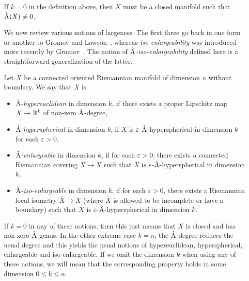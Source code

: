 \documentclass[pdftex]{sigma}
\numberwithin{equation}{section}
\begin{document}
\begin{Remark}
 If \(k = 0\) in the definition above, then \(X\) must be a closed manifold such that \(\hat{\mathrm{A}}(X) \neq 0\).
\end{Remark}

We now review various notions of largeness.
The first three go back in one form or another to Gromov and Lawson~\cite{gromov-lawson:spin-and-scalar-in-presence,GromovLawson:PSCDiracComplete}, whereas \emph{iso-enlargeability} was introduced more recently by Gromov~\cite{Gromov:MetricInequalitiesScalar}.
The notion of \emph{\(\hat{\mathrm{A}}\)-iso-enlargeability} defined here is a straightforward generalization of the latter.

\begin{Definition}
 Let \(X\) be a connected oriented Riemannian manifold of dimension \(n\) without boundary. We say that \(X\) is
 \begin{itemize}\itemsep=0pt
 \item \(\hat{\mathrm{A}}\)-\emph{hypereuclidean} in dimension \(k\), if there exists a proper Lipschitz map \(X \to \mathbb{R}^k\) of non-zero \(\hat{\mathrm{A}}\)-degree,
 \item \(\hat{\mathrm{A}}\)-\emph{hyperspherical} in dimension \(k\), if \(X\) is \(\varepsilon\)-\(\hat{\mathrm{A}}\)-hyperspherical in dimension \(k\) for each \(\varepsilon > 0\),
 \item \(\hat{\mathrm{A}}\)-\emph{enlargeable} in dimension \(k\), if for each \(\varepsilon >0 \), there exists a connected Riemannian covering \(\bar{X} \to X\) such that \(\bar{X}\) is \(\varepsilon\)-\(\hat{\mathrm{A}}\)-hyperspherical in dimension \(k\),
 \item \(\hat{\mathrm{A}}\)-\emph{iso-enlargeable} in dimension \(k\), if for each \(\varepsilon > 0 \), there exists a Riemannian local isometry \(\bar{X} \to X\) (where \(\bar{X}\) is allowed to be incomplete or have a boundary) such that \(\bar{X}\) is \(\varepsilon\)-\(\hat{\mathrm{A}}\)-hyperspherical in dimension \(k\).
 \end{itemize}
\end{Definition}
If \(k = 0\) in any of these notions, then this just means that \(X\) is closed and has non-zero \(\hat{\mathrm{A}}\)-genus.
In the other extreme case \(k = n\), the \(\hat{\mathrm{A}}\)-degree reduces the usual degree and this yields the usual notions of hypereuclidean, hyperspherical, enlargeable and iso-enlargeable.
If we omit the dimension \(k\) when using any of these notions, we will mean that the corresponding property holds in some dimension \(0 \leq k \leq n\).
\end{document}
